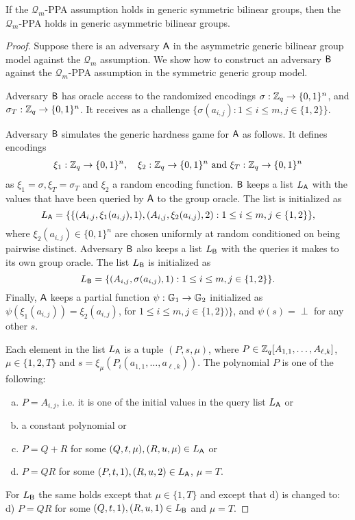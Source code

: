 \begin{theorem}
	If the $\mathcal{Q}_m$-PPA assumption holds in generic symmetric bilinear groups, then the $\mathcal{Q}_m$-PPA holds in generic asymmetric bilinear groups.
\end{theorem}
\begin{proof}
Suppose there is an adversary $\mathsf{A}$  in the asymmetric generic bilinear group model against the $\mathcal{Q}_m$ assumption.  We show how to construct an adversary $\mathsf{B}$ against the  $\mathcal{Q}_m$-PPA assumption in the symmetric generic group model. 


Adversary $\mathsf{B}$ has oracle access to the randomized encodings $\sigma: \mathbb{Z}_q \to \{0,1\}^n$, 
and $\sigma_T: \mathbb{Z}_q \to \{0,1\}^n$. It receives as a challenge $\{ \sigma(a_{i,j}):1\leq i \leq m, j\in\{1,2\}\}$.

Adversary $\mathsf{B}$ simulates the generic hardness game for $\mathsf{A}$ as follows. It defines encodings  
\begin{align*}
	\xi_1: \mathbb{Z}_q \to \{0,1\}^n,\quad \xi_2: \mathbb{Z}_q \to \{0,1\}^n \text{ and }\xi_T: \mathbb{Z}_q \to \{0,1\}^n 
\end{align*}
as $\xi_1=\sigma, \xi_T=\sigma_T$ and $\xi_2$ a random encoding function. $\mathsf{B}$ keeps a list $L_{\mathsf{A}}$  with the values that have been queried by $\mathsf{A}$ to the group oracle. The list is initialized as 
$$L_{\mathsf{A}}=\{  \{(A_{i,j},\xi_1(a_{i,j}),1),(A_{i,j},\xi_2(a_{i,j}),2):1\leq i \leq m, j \in \{1,2\}\},$$
where $\xi_2(a_{i,j}) \in \{0,1\}^n$ are chosen uniformly at random conditioned on being pairwise distinct.  Adversary $\mathsf{B}$ also keeps a list $L_{\mathsf{B}}$ with the queries 
it makes to its own group oracle. The list $L_{\mathsf{B}}$ is initialized as 
$$L_{\mathsf{B}}=\{(A_{i,j},\sigma(a_{i,j}),1):1\leq i \leq m, j \in \{1,2\}\}.$$
Finally, $\mathsf{A}$ keeps a partial function $\psi:\mathbb{G}_1\to\mathbb{G}_2$ initialized as
$ \psi(\xi_1(a_{i,j}))=\xi_2(a_{i,j})$, for $1\leq i\leq m,j\in\{1,2\})\}$, and $\psi(s)=\perp$ for any other $s$.

Each element in the list $L_{\mathsf{A}}$ is a tuple $(P,s,\mu)$, where $P \in \mathbb{Z}_q[A_{1,1}, \ldots,A_{\ell,k}]$, $\mu \in \{1,2,T\}$ and $s=\xi_{\mu}(P_i(a_{1,1},\ldots,a_{\ell,k}))$. The polynomial $P$ is one of the following: 
\begin{enumerate}[a)]
	\item $P=A_{i,j}$, i.e. it is one of the initial values in the query list  
$L_{\mathsf{A}}$  or 
	\item a constant polynomial or
	\item $P=Q+R$ for some $(Q,t,\mu),(R,u,\mu) \in L_{\mathsf{A}}$ or
	\item $P=QR$ for some $(P,t,1),(R,u,2) \in L_{\mathsf{A}}$, $\mu=T$.
\end{enumerate}
	For $L_{\mathsf{B}}$ the same holds except that $\mu \in \{1,T\}$ and except that d) is changed to: d) $P=QR$ for some $(Q,t,1),(R,u,1) \in L_{\mathsf{B}}$ and $\mu=T$. 


\end{proof}
